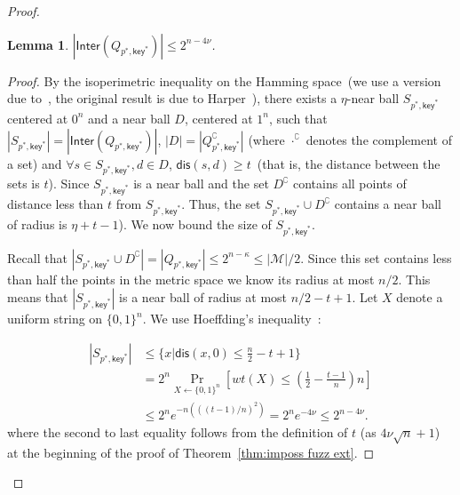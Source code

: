 \documentclass[11pt]{article}
\newcommand{\class}[1]{{\ensuremath{\mathsf{#1}}}}
\newcommand{\key}{\ensuremath{\class{key}}\xspace}
\newcommand{\inter}{\ensuremath{\class{Inter}}\xspace}
\newcommand{\zo}{\ensuremath{\{0, 1\}}}
\newcommand{\dis}{\ensuremath{\mathsf{dis}}}
\newtheorem{lemma}[theorem]{Lemma}
\begin{document}
\begin{proof}
\begin{lemma}
$|\inter(Q_{p^*, \key^*})| \le 2^{n-4\nu}$.
\end{lemma}
\begin{proof}
By the isoperimetric inequality on the Hamming space~(we use a version
due to~\cite[Theorem 1]{frankl1981short}, the original result is due
to Harper~\cite{harper1966optimal}), there exists a $\eta$-near
ball $S_{p^*, \key^*}$ centered at $0^n$ and a near ball $D$,
centered at $1^n$, such that
$|S_{p^*, \key^*}| = |\inter(Q_{p^*, \key^*})|$, $|D| = |Q_{p^*,
  \key^*}^\complement|$ (where $\cdot^\complement$ denotes the
complement of a set) and $\forall s\in S_{p^*, \key^*}, d\in D$,
$\dis(s, d) \ge t$~(that is, the distance between the sets is $t$).  Since $S_{p^*, \key^*}$ is a near ball and the set $D^\complement$ contains all points of distance less than $t$ from $S_{p^*, \key^*}$.  Thus, the set $S_{p^*, \key^*} \cup D^\complement$ contains a near ball of radius is $\eta+t-1$).
We now bound the size of $S_{p^*, \key^*}$.

Recall that $|S_{p^*, \key^*} \cup D^\complement| = |Q_{p^*, \key^*} | \le 2^{n-\kappa}\leq |\mathcal{M}|/2$.  Since this set contains less than half the points in the metric space we know its radius at most $n/2$.  This means that $|S_{p^*, \key^*}|$ is a near ball of radius at most $n/2-t+1$.  Let $X$ denote a uniform string on $\zo^n$.  We use Hoeffding's inequality~\cite{hoeffding1963probability}:

\begin{align*}
|S_{p^*, \key^*}| &\le \{ x | \dis (x, 0)\le \frac{n}{2}-t+1\}\\&= 2^n \Pr_{X\leftarrow \zo^n} [ wt(X) \le (\frac{1}{2}-\frac{t-1}{n})n] \\
&\le 2^n e^{-n (((t-1)/n)^2)} = 2^n e^{-4\nu} \le 2^{n - 4\nu}.
\end{align*}
where the second to last equality follows from the definition of $t$
(as $4\nu \sqrt{n}+1$) at the beginning of the proof of Theorem~\ref{thm:imposs fuzz ext}.
\end{proof}


\end{proof}
\end{document}

